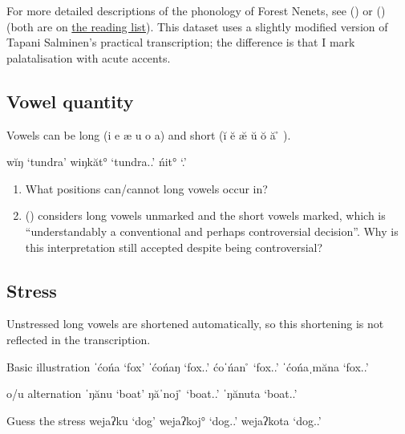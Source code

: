 \documentclass[a4paper, 12pt]{article}
\newcommand{\citeay}[2][]{
   \citeauthor{#2} (\citeyear[#1]{#2})}
\begin{document}
	For more detailed descriptions of the phonology of Forest Nenets, see \citeay{burkova2022} or \citeay{salminen2007} (both are on \href{https://github.com/thddbptnsndshs/EGG_uralic_phonology/blob/main/readings.md}{the reading list}). This dataset uses a slightly modified version of Tapani Salminen's practical transcription; the difference is that I mark palatalisation with acute accents.
	
		\subsection{Vowel quantity}
		
	Vowels can be long (i e æ u o a) and short (ĭ ĕ æ̆ ŭ ŏ ă  ̊ ). 
	
	\pex
		\a wĭŋ `tundra'
		\a wiŋkăt° `tundra.{\El}.{\Sg}' 
		\a ńit° `{\Neg}.{\Fsg}'		
	\xe
	
		
	\begin{enumerate}[$\gg$]
		\item What positions can/cannot long vowels occur in?
		\item \citeay{salminen2007} considers long vowels unmarked and the short vowels marked, which is ``understandably a conventional and perhaps controversial decision''. Why is this interpretation still accepted despite being controversial?
	\end{enumerate}

		\subsection{Stress}
		
	Unstressed long vowels are shortened automatically, so this shortening is not reflected in the transcription.
		
	\pex Basic illustration
		\a ˈćońa `fox'
		\a ˈćońaŋ `fox.{\Gen}.{\Sg}'
		\a ćoˈńan ̊ `fox.{\Dat}.{\Sg}'
		\a ˈćońaˌmăna `fox.{\Prol}.{\Sg}' 
	\xe
		
	\pex o/u alternation
		\a ˈŋănu `boat'
		\a ŋăˈnoj ̊ `boat.{\Poss}.{\Fsg}'
		\a ˈŋănuta `boat.{\Poss}.{\Tsg}' 
	\xe
	
	\pex Guess the stress \label{ex:guessstress}
		\a wejaʔku `dog'
		\a wejaʔkoj° `dog.{\Poss}.{\Fsg}'
		\a wejaʔkota `dog.{\Poss}.{\Tsg}' 
	\xe
		
\end{document}
